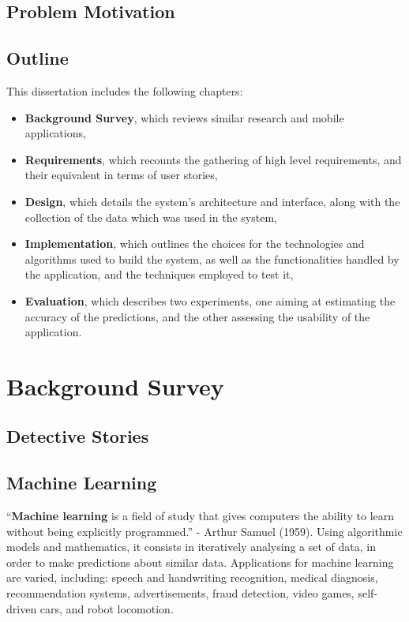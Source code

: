 \documentclass{mproj}
\begin{document}
\section{Problem Motivation}


\section{Outline}

This dissertation includes the following chapters: 
\begin{itemize}
	\item \textbf{Background Survey}, which reviews similar research and mobile applications,
	\item \textbf{Requirements}, which recounts the gathering of high level requirements, and their equivalent in terms of user stories,
	\item \textbf{Design}, which details the system's architecture and interface, along with the collection of the data which was used in the system,
	\item \textbf{Implementation}, which outlines the choices for the technologies and algorithms used to build the system, as well as the functionalities handled by the application, and the techniques employed to test it,
	\item \textbf{Evaluation}, which describes two experiments, one aiming at estimating the accuracy of the predictions, and the other assessing the usability of the application.
\end{itemize}

\chapter{Background Survey}\label{survey}

\section{Detective Stories}

\section{Machine Learning}\label{machine_learning}
``\textbf{Machine learning} is a field of study that gives computers the ability to learn without being explicitly programmed.'' - Arthur Samuel (1959). \cite[Chapter~3]{quotearthursamuel} Using algorithmic models and mathematics, it consists in iteratively analysing a set of data, in order to make predictions about similar data. Applications for machine learning are varied, including: speech and handwriting recognition, medical diagnosis, recommendation systems, advertisements, fraud detection, video games, self-driven cars, and robot locomotion. \par 
\end{document}
